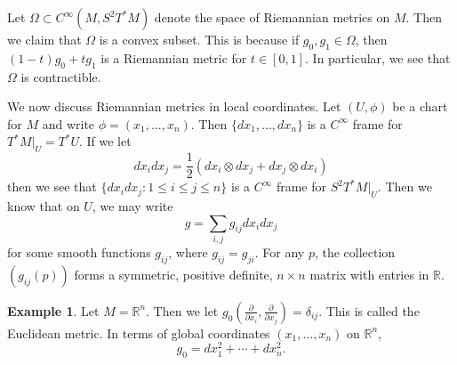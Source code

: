 \documentclass{amsart}
\numberwithin{equation}{section}
\newcommand{\bR}{\mathbb{R}}
\theoremstyle{definition}
\newtheorem{example}[definition]{Example}
\theoremstyle{theorem}
\begin{document}
Let $\Omega \subset C^\infty(M, S^2T^*M)$ denote the space of Riemannian metrics on $M$.  
Then we claim that $\Omega$ is a convex subset. This is because if $g_0, g_1 \in \Omega$, then 
$(1-t)g_0 + tg_1$ is a Riemannian metric for $t\in [0,1]$. In particular, we see that $\Omega$ is contractible. 

\bigskip

We now discuss  Riemannian metrics in local coordinates. Let $(U,\phi)$ be a chart for $M$ and write $\phi = (x_1, \ldots, x_n)$. Then $\{dx_1,\ldots, dx_n\}$ is a $C^\infty$ frame for $T^*M|_U=T^*U$. If we let 
\[
dx_i dx_j = \frac{1}{2}(dx_i \otimes dx_j + dx_j \otimes dx_i)
\]
then we see that $\{dx_idx_j: 1\leq i\leq j\leq n\}$ is a $C^\infty$ frame for $S^2T^*M|_U$. Then we know that on $U$, we may write 
\[
g = \sum_{i,j} g_{ij} dx_idx_j
\]
for some smooth functions $g_{ij}$, where $g_{ij} = g_{ji}$. 
For any $p$, the collection $(g_{ij}(p))$ forms a symmetric, positive definite, 
$n\times n$ matrix with entries in $\bR$. 

\begin{example}
Let $M = \bR^n$. Then we let $g_0(\frac{\partial}{\partial x_i}, \frac{\partial}{\partial x_j}) = \delta_{ij}$. 
This is called the Euclidean metric. In terms of global coordinates $(x_1,\ldots,x_n)$ on $\bR^n$,  
\[
g_0 = dx_1^2 + \cdots + dx_n^2.
\]
\end{example}
\end{document}
